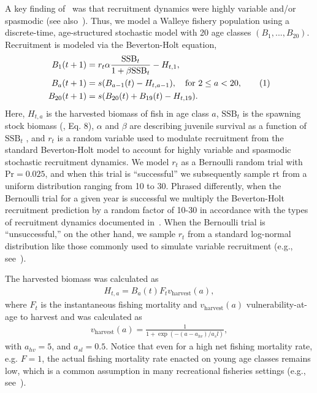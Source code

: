\documentclass[floatfix,nofootinbib,longbibliography,notitlepage]{revtex4-2}
\newcommand\numberthis{\addtocounter{equation}{1}\tag{\theequation}}
\def\vharv{v_{\text{harvest}}}
\def\ssb{\text{SSB}}
\begin{document}
A key finding of~\cite{cahill2022} was that recruitment dynamics were highly variable and/or spasmodic (see also~\cite{caddy-gulland}). 
Thus, we model a Walleye fishery population using a discrete-time, age-structured stochastic model with 20 age classes $(B_1, ... ,B_{20})$. 
Recruitment is modeled via the Beverton-Holt equation,
\begin{align*}
    B_1(t+1) &= r_t \alpha \frac{\ssb_t}{1 + \beta \ssb_t} - H_{t,1},\\
    B_a(t+1) &= s (B_{a-1}(t) - H_{t,a-1}), \quad \text{for } 2 \leq a < 20, \numberthis\\
    B_{20}(t+1) &= s (B_{20}(t) + B_{19}(t) - H_{t,19}).
\end{align*}
Here, $H_{t,a}$ is the harvested biomass of fish in age class $a$, $\ssb_t$ is the spawning stock biomass (\cite{cahill2022}, Eq. 8), $\alpha$ and $\beta$ are describing juvenile survival as a function of $\ssb_t$ , and $r_t$ is a random variable used to modulate recruitment from the standard Beverton-Holt model to account for highly variable and spasmodic stochastic recruitment dynamics. 
We model $r_t$ as a Bernoulli random trial with $\text{Pr}=0.025$, and when this trial is “successful” we subsequently sample rt from a uniform distribution ranging from 10 to 30. 
Phrased differently, when the Bernoulli trial for a given year is successful we multiply the Beverton-Holt recruitment prediction by a random factor of 10-30 in accordance with the types of recruitment dynamics documented in~\cite{cahill2022}. 
When the Bernoulli trial is “unsuccessful,” on the other hand, we sample $r_t$ from a standard log-normal distribution like those commonly used to simulate variable recruitment (e.g., see~\cite{quinn-deriso}).

The harvested biomass was calculated as
\begin{align*}
    H_{t,a} = B_a(t) F_t \vharv(a),
\end{align*}
where $F_t$ is the instantaneous  fishing mortality and $\vharv(a)$ vulnerability-at-age to harvest and was calculated as
\begin{align}
    \vharv(a) = \frac1{1 + \exp(-(a-a_{hv})/a_sl)},
\end{align}
with $a_{hv}=5$, and $a_{sl}=0.5$. 
Notice that even for a high net fishing mortality rate, e.g. $F=1$, the actual fishing mortality rate enacted on young age classes remains low, which is a common assumption in many recreational fisheries settings (e.g., see~\cite{golden2022focusing}).
\end{document}
